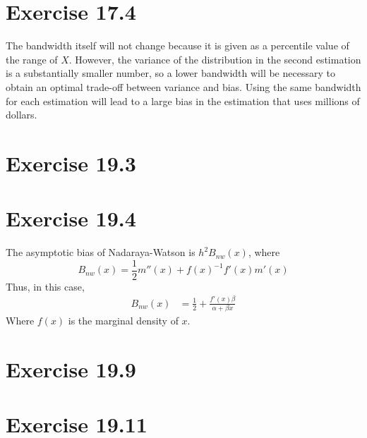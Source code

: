 \documentclass{article}
\begin{document}

\section*{Exercise 17.4}
The bandwidth itself will not change because it is given as a percentile value of the range of $X$. However, the variance of the distribution in the second estimation is a substantially smaller number, so a lower bandwidth will be necessary to obtain an optimal trade-off between variance and bias. Using the same bandwidth for each estimation will lead to a large bias in the estimation that uses millions of dollars.


\section*{Exercise 19.3}




\section*{Exercise 19.4}
The asymptotic bias of Nadaraya-Watson is $h^2B_{nw}(x)$, where $$ B_{nw}(x) = \frac{1}{2}m''(x) + f(x)^{-1}f'(x)m'(x) $$ Thus, in this case,
\begin{align*}
	B_{nw}(x) &= \frac{1}{2} + \frac{f'(x)\beta}{\alpha + \beta x}
\end{align*}
Where $f(x)$ is the marginal density of $x$. 


\section*{Exercise 19.9}



\section*{Exercise 19.11}


\end{document}
